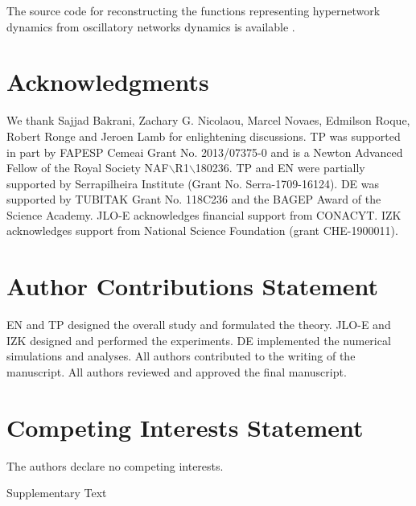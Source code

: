 \documentclass[12pt]{article}
\theoremstyle{plain}
\theoremstyle{definition}
\theoremstyle{remark}
\theoremstyle{remark}
\begin{document}
The source code for reconstructing the functions representing hypernetwork dynamics from oscillatory networks dynamics is available  \cite{nijholt_eddie_2021_5749164}.







\section*{Acknowledgments}
We thank  Sajjad Bakrani, Zachary G. Nicolaou, Marcel Novaes, Edmilson Roque, Robert Ronge and Jeroen Lamb for enlightening discussions. TP was  supported in part by FAPESP Cemeai Grant No. 2013/07375-0 and is a Newton Advanced Fellow of the Royal Society NAF$\backslash$R1$\backslash$180236. TP and EN 
were partially supported by Serrapilheira Institute (Grant No. Serra-1709-16124). DE was supported by TUBITAK Grant No. 118C236 and the BAGEP Award of the Science Academy. JLO-E acknowledges financial support from CONACYT. IZK acknowledges support from National Science Foundation (grant CHE-1900011). 


\section*{Author Contributions Statement}
EN and TP designed the overall study and formulated the theory. JLO-E and IZK designed and performed the experiments. DE implemented the numerical simulations and analyses. All authors contributed to the writing of the manuscript. All authors reviewed and approved the final manuscript.


\section*{Competing Interests Statement}
The authors declare no competing interests.


\bigskip{}

\noindent
Supplementary Text\\

\clearpage

\clearpage
\baselineskip18pt

\setcounter{page}{1}

\renewcommand{\theequation}{S\arabic{equation}}
\end{document}
